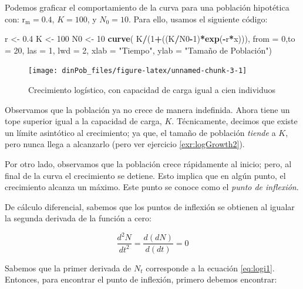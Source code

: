 \documentclass[12pt,letterpaper,]{book}
\newenvironment{Shaded}{\begin{snugshade}}{\end{snugshade}}
\newcommand{\KeywordTok}[1]{\textcolor[rgb]{0.13,0.29,0.53}{\textbf{#1}}}
\newcommand{\DataTypeTok}[1]{\textcolor[rgb]{0.13,0.29,0.53}{#1}}
\newcommand{\DecValTok}[1]{\textcolor[rgb]{0.00,0.00,0.81}{#1}}
\newcommand{\FloatTok}[1]{\textcolor[rgb]{0.00,0.00,0.81}{#1}}
\newcommand{\StringTok}[1]{\textcolor[rgb]{0.31,0.60,0.02}{#1}}
\newcommand{\OperatorTok}[1]{\textcolor[rgb]{0.81,0.36,0.00}{\textbf{#1}}}
\newcommand{\NormalTok}[1]{#1}
\begin{document}
Podemos graficar el comportamiento de la curva para una población
hipotética con: \(\mathrm{r_m} = 0.4\), \(K = 100\), y \(N_0 = 10\).
Para ello, usamos el siguiente código:

\begin{Shaded}
\begin{Highlighting}[]
\NormalTok{r <-}\StringTok{ }\FloatTok{0.4}
\NormalTok{K <-}\StringTok{ }\DecValTok{100}
\NormalTok{N0 <-}\StringTok{ }\DecValTok{10}
\KeywordTok{curve}\NormalTok{(}
\NormalTok{  K}\OperatorTok{/}\NormalTok{(}\DecValTok{1}\OperatorTok{+}\NormalTok{((K}\OperatorTok{/}\NormalTok{N0}\OperatorTok{-}\DecValTok{1}\NormalTok{)}\OperatorTok{*}\KeywordTok{exp}\NormalTok{(}\OperatorTok{-}\NormalTok{r}\OperatorTok{*}\NormalTok{x))),}
  \DataTypeTok{from =} \DecValTok{0}\NormalTok{,}\DataTypeTok{to =} \DecValTok{20}\NormalTok{,}
  \DataTypeTok{las =} \DecValTok{1}\NormalTok{, }\DataTypeTok{lwd =} \DecValTok{2}\NormalTok{, }
  \DataTypeTok{xlab =} \StringTok{"Tiempo"}\NormalTok{, }\DataTypeTok{ylab =} \StringTok{"Tamaño de Población")}
\end{Highlighting}
\end{Shaded}

\begin{figure}[h]

{\centering \texttt{[image: dinPob\_files/figure-latex/unnamed-chunk-3-1]} 

}

\caption{Crecimiento logístico, con capacidad de carga igual a cien individuos}\label{fig:unnamed-chunk-3}
\end{figure}

Observamos que la población ya no crece de manera indefinida. Ahora
tiene un tope superior igual a la capacidad de carga, \(K\).
Técnicamente, decimos que existe un límite asintótico al crecimiento; ya
que, el tamaño de población \emph{tiende} a \(K\), pero nunca llega a
alcanzarlo (pero ver ejercicio \ref{exr:logGrowth2}).

Por otro lado, observamos que la población crece rápidamente al inicio;
pero, al final de la curva el crecimiento se detiene. Esto implica que
en algún punto, el crecimiento alcanza un máximo. Este punto se conoce
como el \emph{punto de inflexión}.

De cálculo diferencial, sabemos que los puntos de inflexión se obtienen
al igualar la segunda derivada de la función a cero:

\[
\frac{d^2N}{dt^2}=\frac{d(dN)}{d(dt)}=0
\]

Sabemos que la primer derivada de \(N_t\) corresponde a la ecuación
\eqref{eq:logi1}. Entonces, para encontrar el punto de inflexión, primero
debemos encontrar:
\end{document}
